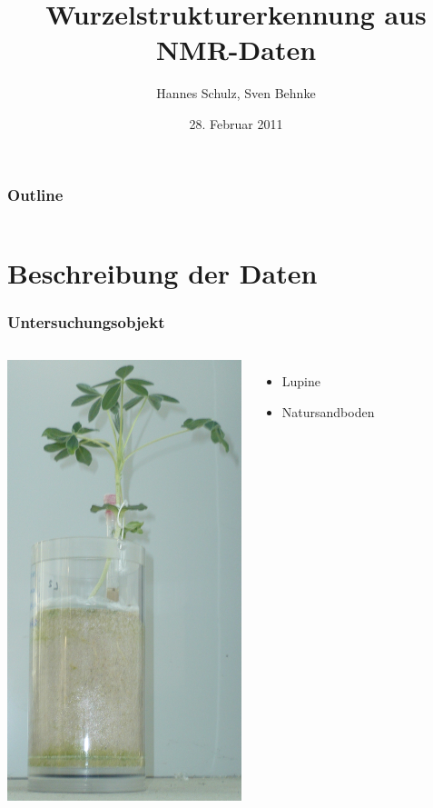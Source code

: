 \documentclass[final,ngerman,ignorenonframetext,compress]{beamer}
\title[Wurzelstrukturerkennung]{Wurzelstrukturerkennung aus NMR-Daten}
\author[Schulz, Behnke]{Hannes Schulz, Sven Behnke}
\institute[Uni Bonn, Germany]%
{\texttt{[image: Logo\_UBo\_h24\_4c-crop]}}
\date{28. Februar 2011}
\begin{document}
\begin{frame}[plain]
	\titlepage%
\end{frame}


\begin{frame}[plain] %
	\frametitle{Outline}
		\begin{columns}
			\tableofcontents[hidesubsections]
		\end{columns}
\end{frame}

\section{Beschreibung der Daten}

\begin{frame}
	\frametitle{Untersuchungsobjekt}
	\begin{columns}
		\column{.5\linewidth}
		\begin{center}
			\includegraphics[width=.6\linewidth]{img/o2}
		\end{center}
		\column{.5\linewidth}
		\begin{itemize}
			\item Lupine
			\item Natursandboden
		\end{itemize}
	\end{columns}
\end{frame}
\end{document}
